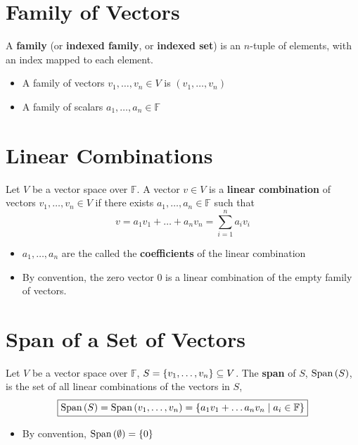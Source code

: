 \documentclass[letterpaper,12pt]{article}
\begin{document}
\section*{Family of Vectors}
\begin{definition}
A \textbf{family} (or \textbf{indexed family}, or \textbf{indexed set}) is an $n$-tuple of elements, with an index mapped to each element.
\begin{itemize}
    \item A family of vectors $v_1, \dots, v_n \in V$ is $(v_1, \dots, v_n)$
    \item A family of scalars $a_1, \dots, a_n \in \mathbb{F}$
\end{itemize}
\end{definition}

\section*{Linear Combinations}
\begin{definition}
Let $V$ be a vector space over $\mathbb{F}$. A vector $v \in V$ is a \textbf{linear combination} of vectors $v_1, \dots, v_n \in V$ if there exists $a_1, \dots, a_n \in \mathbb{F}$ such that
\begin{equation*}
    v = a_1 v_1 + \dots + a_n v_n = \sum_{i=1}^n a_i v_i
\end{equation*}
\begin{itemize}
    \item $a_1, \dots, a_n$ are the called the \textbf{coefficients} of the linear combination
    \item By convention, the zero vector $0$ is a linear combination of the empty family of vectors.
\end{itemize}
\end{definition}

\section*{Span of a Set of Vectors}
\begin{definition}
Let $V$ be a vector space over $\mathbb{F}$, $S = \left\{ v_1, \dots, v_n \right\} \subseteq V$. The \textbf{span} of $S$, $\text{Span}\left(S \right)$, is the set of all linear combinations of the vectors in $S$,
\begin{equation*}
    \boxed{\text{Span}\left(S \right) = \text{Span}\left(v_1, \dots, v_n \right) = \left\{ a_1 v_1 + \dots a_n v_n \mid a_i \in \mathbb{F} \right\}}
\end{equation*}
\begin{itemize}
    \item By convention, $\text{Span}\left(\emptyset \right) = \left\{ 0 \right\}$
\end{itemize}
\end{definition}
\end{document}
